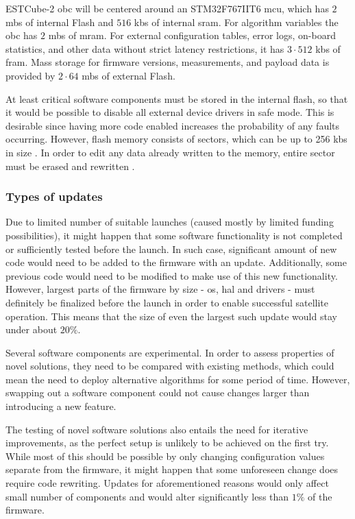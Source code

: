 ESTCube-2 \gls{obc} will be centered around an STM32F767IIT6 \gls{mcu}, which has $2$ \glspl{mb} of internal Flash and $516$ \glspl{kb} of internal \gls{sram}. For algorithm variables the \gls{obc} has $2$ \glspl{mb} of \gls{mram}. For external configuration tables, error logs, on-board statistics, and other data without strict latency restrictions, it has $3\cdot512$ \glspl{kb} of \gls{fram}. Mass storage for firmware versions, measurements, and payload data is provided by $2\cdot64$ \glspl{mb} of external Flash. \cite{Haljaste2017}

At least critical software components must be stored in the internal flash, so that it would be possible to disable all external device drivers in safe mode. This is desirable since having more code enabled increases the probability of any faults occurring. However, flash memory consists of sectors, which can be up to 256 \glspl{kb} in size \cite{STMicroelectronics2018}. In order to edit any data already written to the memory, entire sector must be erased and rewritten \cite{STMicroelectronics2018}.

\subsubsection{Types of updates}

Due to limited number of suitable launches (caused mostly by limited funding possibilities), it might happen that some software functionality is not completed or sufficiently tested before the launch. In such case, significant amount of new code would need to be added to the firmware with an update. Additionally, some previous code would need to be modified to make use of this new functionality. However, largest parts of the firmware by size - \gls{os}, \gls{hal} and drivers - must definitely be finalized before the launch in order to enable successful satellite operation. This means that the size of even the largest such update would stay under about $20\%$.

Several software components are experimental. In order to assess properties of novel solutions, they need to be compared with existing methods, which could mean the need to deploy alternative algorithms for some period of time. However, swapping out a software component could not cause changes larger than introducing a new feature.

The testing of novel software solutions also entails the need for iterative improvements, as the perfect setup is unlikely to be achieved on the first try. While most of this should be possible by only changing configuration values separate from the firmware, it might happen that some unforeseen change does require code rewriting. Updates for aforementioned reasons would only affect small number of components and would alter significantly less than $1\%$ of the firmware.

